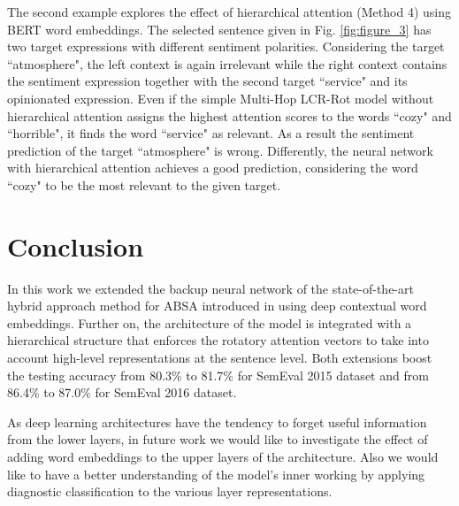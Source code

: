 \documentclass[hidelinks]{llncs}
\begin{document}
The second example explores the effect of hierarchical attention (Method 4) using BERT word embeddings. The selected sentence given in Fig. \ref{fig:figure_3} has two target expressions with different sentiment polarities. Considering the target ``atmosphere", the left context is again irrelevant while the right context contains the sentiment expression together with the second target ``service" and its opinionated expression. Even if the simple Multi-Hop LCR-Rot model without hierarchical attention assigns the highest attention scores to the words ``cozy" and ``horrible", it finds the word ``service" as relevant. As a result the sentiment prediction of the target ``atmosphere" is wrong. Differently, the neural network with hierarchical attention achieves a good prediction, considering the word ``cozy" to be the most relevant to the given target.

\section{Conclusion} \label{Conclusion}
In this work we extended the backup neural network of the state-of-the-art hybrid approach method for ABSA introduced in \cite{wallaart2019hybrid} using deep contextual word embeddings. Further on, the architecture of the model is integrated with a hierarchical structure that enforces the rotatory attention vectors to take into account high-level representations at the sentence level. Both extensions boost the testing accuracy from 80.3\% to 81.7\% for SemEval 2015 dataset and from 86.4\% to 87.0\% for SemEval 2016 dataset.




As deep learning architectures have the tendency to forget useful information from the lower layers, in future work we would like to investigate the effect of adding word embeddings to the upper layers of the architecture. Also we would like to have a better understanding of the model's inner working by applying diagnostic classification to the various layer representations.





\end{document}
